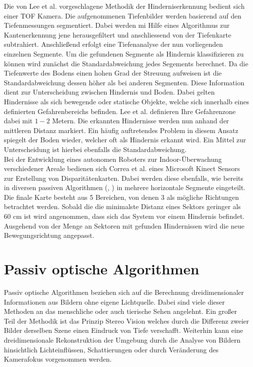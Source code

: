 \noindent
Die von Lee et al. \cite{lee2012intelligent} vorgeschlagene Methodik der Hinderniserkennung bedient sich einer TOF Kamera. Die aufgenommenen Tiefenbilder werden basierend auf den Tiefenmessungen segmentiert. Dabei werden mi Hilfe eines Algorithmus zur Kantenerkennung jene herausgefiltert und anschliessend von der Tiefenkarte subtrahiert. Anschließend erfolgt eine Tiefenanalyse der nun vorliegenden einzelnen Segmente. Um die gefundenen Segmente als Hindernis klassifizieren zu können wird zunächst die Standardabweichung jedes Segements berechnet. Da die Tiefenwerte des Bodens einen hohen Grad der Streuung aufweisen ist die Standardabweichung dessen höher als bei anderen Segmenten. Diese Information dient zur Unterscheidung zwischen Hindernis und Boden. Dabei gelten Hindernisse als sich bewegende oder statische Objekte, welche sich innerhalb eines definierten Gefahrenbereichs befinden. Lee et al. definieren Ihre Gefahrenzone dabei mit $1-2$ Metern. Die erkannten Hindernisse werden nun anhand der mittleren Distanz markiert. Ein häufig auftretendes Problem in diesem Ansatz spiegelt der Boden wieder, welcher oft als Hindernis erkannt wird. Ein Mittel zur Unterscheidung ist hierbei ebenfalls die Standardabweichung.\\

\noindent
Bei der Entwicklung eines autonomen Roboters zur Indoor-Überwachung verschiedener Areale bedienen sich Correa et al. \cite{correa2012mobile} eines Microsoft Kinect Sensors zur Erstellung von Disparitätenkarten. Dabei werden diese ebenfalls, wie bereits in diversen passiven Algorithmen (\cite{pire2012stereo}, \cite{kostavelis2010comparative}) in mehrere horizontale Segmente eingeteilt. Die finale Karte besteht aus 5 Bereichen, von denen 3 als mögliche Richtungen betrachtet werden. Sobald die die minimalste Distanz eines Sektors geringer als 60 cm ist wird angenommen, dass sich das System vor einem Hindernis befindet. Ausgehend von der Menge an Sektoren mit gefunden Hindernissen wird die neue Bewegungsrichtung angepasst.

\section{Passiv optische Algorithmen}
\label{sec:sensor_basierte_he}
Passiv optische Algorithmen beziehen sich auf die Berechnung dreidimensionaler Informationen aus Bildern ohne eigene Lichtquelle. Dabei sind viele dieser Methoden an das menschliche oder auch tierische Sehen angelehnt. Ein großer Teil der Methodik ist das Prinzip Stereo Vision welches durch die Differenz zweier Bilder derselben Szene einen Eindruck von Tiefe verschafft. Weiterhin kann eine dreidimensionale Rekonstruktion der Umgebung durch die Analyse von Bildern hinsichtlich Lichteinflüssen, Schattierungen oder durch Veränderung des Kamerafokus vorgenommen werden.\\

